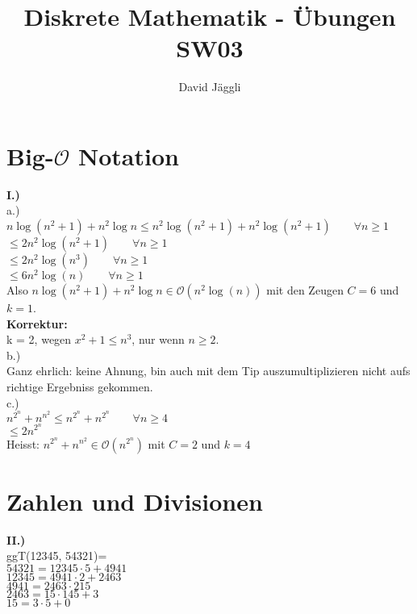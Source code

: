 \documentclass[12pt]{scrartcl}
\author{David Jäggli}
\title{Diskrete Mathematik - Übungen SW03}
\begin{document}
\maketitle

\tableofcontents

\newpage
\section{Big-$\mathcal{O}$ Notation}
\textbf{I.)}\\
a.)\\
$n \log(n^2+1) + n^2 \log n \leq n^2 \log(n^2 + 1) + n^2 \log(n^2+1) \quad\quad \forall n \geq 1$\\
$\leq 2n^2 \log(n^2 + 1) \quad\quad \forall n \geq 1$\\
$\leq 2n^2 \log(n^3) \quad\quad \forall n \geq 1$\\
$\leq 6n^2 \log(n) \quad\quad \forall n \geq 1$\\

Also $n \log(n^2+1) + n^2 \log n \in \mathcal{O}(n^2 \log(n))$ mit den Zeugen $C=6$ und $k=1$.\\

\textbf{Korrektur:}\\
k = 2, wegen $x^2 + 1 \leq n^3$, nur wenn $n \geq 2$.\\


b.)\\
Ganz ehrlich: keine Ahnung, bin auch mit dem Tip auszumultiplizieren nicht aufs richtige Ergebniss
gekommen.\\


c.)\\
$n^{2^n} + n^{n^2} \leq n^{2^n} + n^{2^n} \quad\quad \forall n \geq 4$\\
$\leq  2n^{2^n}$\\

Heisst: $n^{2^n} + n^{n^2} \in \mathcal{O}(n^{2^n})$ mit $C = 2$ und $k=4$


\section{Zahlen und Divisionen}
\textbf{II.)}\\

ggT(12345, 54321)=\\

$54321 = 12345 \cdot 5 + 4941$\\
$12345 = 4941 \cdot 2 + 2463$\\
$4941 = 2463 \cdot 2 15$\\
$2463 = 15 \cdot 145 + 3$\\
$15 = 3 \cdot 5 + 0 $\\
\end{document}
